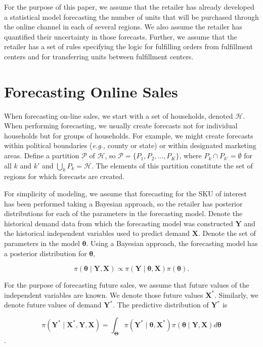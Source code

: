 \documentclass[11pt, oneside]{article}   	%
\begin{document}
For the purpose of this paper, we assume that the retailer has already developed a statistical model forecasting the number of units that will be purchased through the online channel in each of several regions.  We also assume the retailer has quantified their uncertainty in those forecasts.  Further, we assume that the retailer has a set of rules specifying the logic for fulfilling orders from fulfillment centers and for transferring units between fulfillment centers.

\section{Forecasting Online Sales}

When forecasting on-line sales, we start with a set of households, denoted $\mathcal{H}$.  When performing forecasting, we usually create forecasts not for individual households but for groups of households.  For example, we might create forecasts within political boundaries (\emph{e.g.,} county or state) or within designated marketing areas.  Define a partition $\mathcal{P}$ of $\mathcal{H}$, so $\mathcal{P} = \{P_1, P_2, ..., P_K \}$, where $P_k \cap P_{k'} = \emptyset$ for all $k$ and $k'$ and $\bigcup_k P_k = \mathcal{H}$.  The elements of this partition constitute the set of regions for which forecasts are created.

For simplicity of modeling, we assume that forecasting for the SKU of interest has been performed taking a Bayesian approach, so the retailer has posterior distributions for each of the parameters in the forecasting model.  Denote the historical demand data from which the forecasting model was constructed $\mathbf{Y}$ and the historical independent variables used to predict demand $\mathbf{X}$.  Denote the set of parameters in the model $\boldsymbol{\theta}$.  Using a Bayesian approach, the forecasting model has a posterior distribution for $\boldsymbol{\theta}$,

$$\pi (\boldsymbol{\theta} \mid \mathbf{Y}, \mathbf{X}) \propto \pi (\mathbf{Y} \mid \boldsymbol{\theta}, \mathbf{X}) \pi (\boldsymbol{\theta}).$$

\noindent For the purpose of forecasting future sales, we assume that future values of the independent variables are known.  We denote those future values $\mathbf{X}^*$.  Similarly, we denote future values of demand $\mathbf{Y}^*$.  The predictive distribution of $\mathbf{Y}^*$ is

$$\pi (\mathbf{Y}^* \mid \mathbf{X}^*, \mathbf{Y}, \mathbf{X}) = \int_{\boldsymbol{\Theta}} \pi (\mathbf{Y}^* \mid \boldsymbol{\theta}, \mathbf{X}^*) \pi (\boldsymbol{\theta} \mid \mathbf{Y}, \mathbf{X}) d \boldsymbol{\theta}$$.
\end{document}
